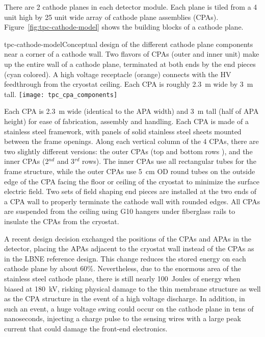 There are 2 cathode planes in each detector module.  Each plane is
tiled from a 4 unit high by 25 unit wide array of cathode plane
assemblies (CPAs). Figure~\ref{fig:tpc-cathode-model} shows the
building blocks of a cathode plane.  
\begin{cdrfigure}
{tpc-cathode-model}{Conceptual design of the different cathode plane 
components near a corner of a cathode wall.  Two flavors of CPAs (outer 
and inner unit) make up the entire wall of a cathode plane, terminated 
at both ends by the end pieces (cyan colored).  A high voltage receptacle 
(orange) connects with the HV feedthrough from the cryostat ceiling. Each 
CPA is roughly 2.3~m wide by 3~m tall.}
\texttt{[image: tpc\_cpa\_components]}
\end{cdrfigure}
Each CPA is 2.3~m wide (identical to the APA width) and 3~m tall (half
of APA height) for ease of fabrication, assembly and handling.  Each
CPA is made of a stainless steel framework, with panels of solid
stainless steel sheets mounted between the frame openings.  Along each
vertical column of the 4 CPAs, there are two slightly different
versions: the outer CPAs (top and bottom rows ), and the inner CPAs
(2$^{nd}$ and 3$^{rd}$ rows).  The inner CPAs use all rectangular tubes for the
frame structure, while the outer CPAs use 5~cm OD round tubes on the
outside edge of the CPA facing the floor or ceiling of the cryostat to
minimize the surface electric field.  Two sets of field shaping end
pieces are installed at the two ends of a CPA wall to properly
terminate the cathode wall with rounded edges.  All CPAs are suspended
from the ceiling using G10 hangers under fiberglass rails to insulate
the CPAs from the cryostat.

A recent design decision exchanged the positions of the CPAs and APAs
in the detector, placing the APAs adjacent to the cryostat wall
instead of the CPAs as in the LBNE reference design.  This change
reduces the stored energy on each cathode plane by about 60\%.
Nevertheless, due to the enormous area of the stainless steel cathode
plane, there is still nearly 100~Joules of energy when biased at
180~kV, risking physical damage to the thin membrane structure as well
as the CPA structure in the event of a high voltage discharge.  In
addition, in such an event, a huge voltage swing could occur on the
cathode plane in tens of nanoseconds, injecting a charge pulse to the
sensing wires with a large peak current that could damage the
front-end electronics.

